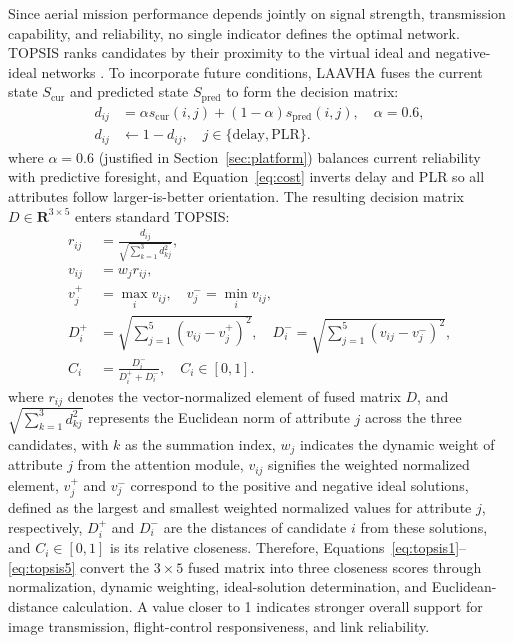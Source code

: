 \documentclass[preprint,12pt]{elsarticle}
\begin{document}
Since aerial mission performance depends jointly on signal strength, transmission capability, and reliability, no single indicator defines the optimal network. TOPSIS ranks candidates by their proximity to the virtual ideal and negative-ideal networks \cite{ref8,ref9}. To incorporate future conditions, LAAVHA fuses the current state $S_{\mathrm{cur}}$ and predicted state $S_{\mathrm{pred}}$ to form the decision matrix:
\begin{align}
d_{ij} &= \alpha s_{\mathrm{cur}}(i,j)+(1-\alpha)s_{\mathrm{pred}}(i,j),\quad \alpha=0.6, \label{eq:fuse}\\
d_{ij} &\leftarrow 1-d_{ij},\quad j\in\{\mathrm{delay},\mathrm{PLR}\}. \label{eq:cost}
\end{align}
where $\alpha=0.6$ (justified in Section~\ref{sec:platform}) balances current reliability with predictive foresight, and Equation~\eqref{eq:cost} inverts delay and PLR so all attributes follow larger-is-better orientation. The resulting decision matrix $D\in\mathbf{R}^{3\times5}$ enters standard TOPSIS:
\begin{align}
r_{ij} &= \frac{d_{ij}}{\sqrt{\sum_{k=1}^{3}d_{kj}^{2}}}, \label{eq:topsis1}\\
v_{ij} &= w_j r_{ij}, \label{eq:topsis2}\\
v_j^+ &= \max_i v_{ij},\quad v_j^-=\min_i v_{ij}, \label{eq:topsis3}\\
D_i^+ &= \sqrt{\sum_{j=1}^{5}(v_{ij}-v_j^+)^2},\quad
D_i^-=\sqrt{\sum_{j=1}^{5}(v_{ij}-v_j^-)^2}, \label{eq:topsis4}\\
C_i &= \frac{D_i^-}{D_i^+ + D_i^-},\quad C_i\in[0,1]. \label{eq:topsis5}
\end{align}
where $r_{ij}$ denotes the vector-normalized element of fused matrix $D$, and $\sqrt{\sum_{k=1}^{3}d_{kj}^{2}}$ represents the Euclidean norm of attribute $j$ across the three candidates, with $k$ as the summation index, $w_j$ indicates the dynamic weight of attribute $j$ from the attention module, $v_{ij}$ signifies the weighted normalized element, $v_j^+$ and $v_j^-$ correspond to the positive and negative ideal solutions, defined as the largest and smallest weighted normalized values for attribute $j$, respectively, $D_i^+$ and $D_i^-$ are the distances of candidate $i$ from these solutions, and $C_i\in[0,1]$ is its relative closeness. Therefore, Equations~\eqref{eq:topsis1}--\eqref{eq:topsis5} convert the $3\times5$ fused matrix into three closeness scores through normalization, dynamic weighting, ideal-solution determination, and Euclidean-distance calculation. A value closer to 1 indicates stronger overall support for image transmission, flight-control responsiveness, and link reliability.
\end{document}
